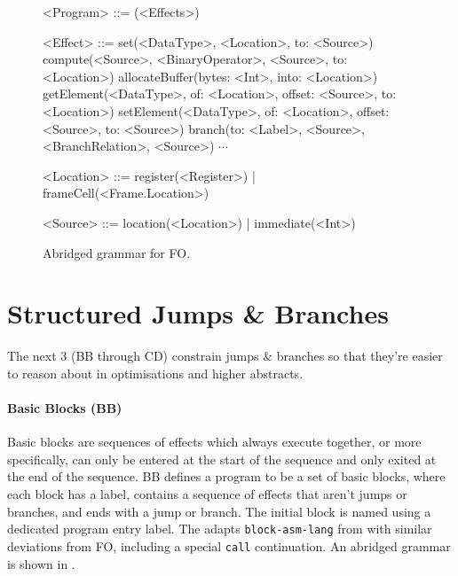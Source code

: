 \documentclass[main.tex]{subfiles}
\begin{document}
\begin{figure}[ht]
	\small
	\begin{grammar}
		
		<Program> ::= (<Effects>)
		
		<Effect> ::= set(<DataType>, <Location>, to: <Source>)
			\alt compute(<Source>, <BinaryOperator>, <Source>, to: <Location>)
			\alt allocateBuffer(bytes: <Int>, into: <Location>)
			\alt getElement(<DataType>, of: <Location>, offset: <Source>, to: <Location>)
			\alt setElement(<DataType>, of: <Location>, offset: <Source>, to: <Source>)
			\alt branch(to: <Label>, <Source>, <BranchRelation>, <Source>)
			\alt $\cdots$
		
		<Location> ::= register(<Register>) | frameCell(<Frame.Location>)
		
		<Source> ::= location(<Location>) | immediate(<Int>)
		
	\end{grammar}
	\caption{Abridged grammar for FO.}
	\label{bnf:fo}
\end{figure}

\section{Structured Jumps \& Branches}
The next 3 \ils{} (BB through CD) constrain jumps \& branches so that they're easier to reason about in optimisations and higher abstracts.

\paragraph{Basic Blocks (BB)} Basic blocks are sequences of effects which always execute together, or more specifically, can only be entered at the start of the sequence and only exited at the end of the sequence. BB defines a program to be a set of basic blocks, where each block has a label, contains a sequence of effects that aren't jumps or branches, and ends with a jump or branch. The initial block is named using a dedicated program entry label. The \il{} adapts \texttt{block-asm-lang} from \cite{compcourse} with similar deviations from FO, including a special \texttt{call} continuation. An abridged grammar is shown in .
\end{document}
